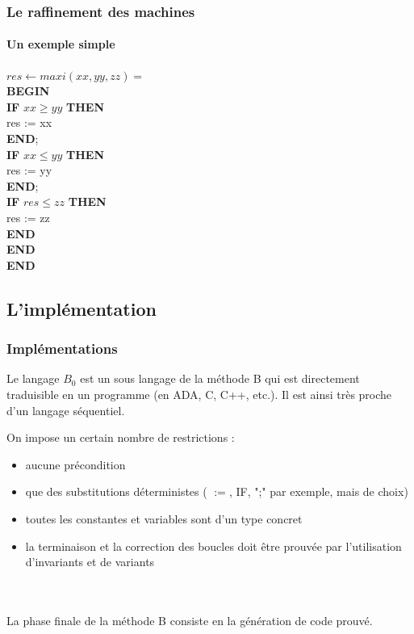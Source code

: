 \documentclass[11pt,a4paper,xcolor=table]{beamer} %
\begin{document}
\begin{frame}
\frametitle{Le raffinement des machines}
\framesubtitle{Un exemple simple}
$res \leftarrow maxi ( xx , yy , zz ) = $ \\
\hspace*{1em}    \textbf{BEGIN} \\
\hspace*{1em}    \textbf{IF} $xx \geq yy$ \textbf{THEN} \\
\hspace*{2em}        res := xx \\
\hspace*{1em}    \textbf{END}; \\
\hspace*{1em}   \textbf{IF} $xx \leq yy$  \textbf{THEN} \\
\hspace*{2em}        res := yy \\
\hspace*{1em}    \textbf{END}; \\
\hspace*{1em}   \textbf{IF} $res \leq zz$ \textbf{THEN} \\
\hspace*{2em}        res := zz \\
\hspace*{1em}    \textbf{END} \\
\hspace*{1em}    \textbf{END} \\
\textbf{END}
\end{frame}

\subsection{L'implémentation}
\begin{frame}
\frametitle{Implémentations}
Le langage $B_0$ est un sous langage de la méthode B qui est directement traduisible en un programme (en ADA, C, C++, etc.).  Il est ainsi très proche d'un langage séquentiel.

\pause

On impose un certain nombre de restrictions :
\begin{itemize}
\item aucune précondition
\pause
\item que des substitutions déterministes ( $:=$, \textsc{IF}, ";" par exemple, mais de choix)
\pause
\item toutes les constantes et variables sont d'un type concret
\pause
\item la terminaison et la correction des boucles doit être prouvée par l'utilisation d'invariants et de variants
\end{itemize}
~\\~\\\pause
La phase finale de la méthode B consiste en la génération de code prouvé.

\end{frame}
\end{document}
